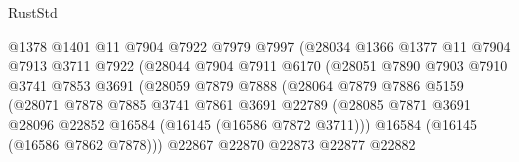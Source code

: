 \begin{lexlean}{RustStd}
\begin{coremodule}
                                  @1378
                                  @1401
                                  @11
                                  @7904
                                  @7922
                                  @7979
                                  @7997
                                  (@28034
                                    @1366
                                    @1377
                                    @11
                                    @7904
                                    @7913
                                    @3711
                                    @7922
                                    (@28044
                                      @7904
                                      @7911
                                      @6170
                                      (@28051
                                        @7890
                                        @7903
                                        @7910
                                        @3741
                                        @7853
                                        @3691
                                        (@28059
                                          @7879
                                          @7888
                                          (@28064
                                            @7879
                                            @7886
                                            @5159
                                            (@28071
                                              @7878
                                              @7885
                                              @3741
                                              @7861
                                              @3691
                                              @22789
                                              (@28085
                                                @7871
                                                @3691
                                                @28096
                                                @22852
                                                @16584
                                                (@16145 (@16586 @7872 @3711)))
                                              @16584
                                              (@16145 (@16586 @7862 @7878)))
                                            @22867
                                            @22870
                                            @22873
                                            @22877
                                            @22882

\end{coremodule}
\end{lexlean}
